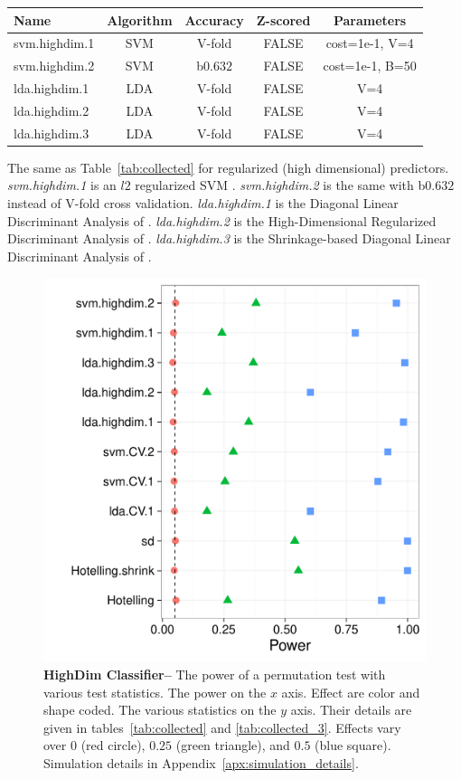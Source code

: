 \documentclass[12pt,a4paper]{article}
\theoremstyle{definition}
\begin{document}
\begin{tcolorbox}
\centering
\begin{tabular}{l|c|c|c|c}
Name & Algorithm & Accuracy & Z-scored & Parameters\\ 
\hline
\hline
svm.highdim.1 & SVM & V-fold & FALSE & cost=1e-1, V=4 \\ 
svm.highdim.2 & SVM & b$0.632$ & FALSE & cost=1e-1, B=50 \\ 
lda.highdim.1 & LDA & V-fold & FALSE & V=4 \\ 
lda.highdim.2 & LDA & V-fold & FALSE & V=4 \\ 
lda.highdim.3 & LDA & V-fold & FALSE & V=4 \\ 
\end{tabular} 
\captionsetup{type=table}
\caption{
The same as Table~\ref{tab:collected} for regularized (high dimensional) predictors. 
\emph{svm.highdim.1} is an $l2$ regularized SVM \cite{friedman_regularization_2010}. 
\emph{svm.highdim.2} is the same with b$0.632$ instead of V-fold cross validation. 
\emph{lda.highdim.1} is the Diagonal Linear Discriminant Analysis of \cite{dudoit_comparison_2002}.
\emph{lda.highdim.2} is the High-Dimensional Regularized Discriminant Analysis of \cite{ramey_high-dimensional_2016}.
\emph{lda.highdim.3} is the Shrinkage-based Diagonal Linear Discriminant Analysis of \cite{pang_shrinkage-based_2009}.
} 
\label{tab:collected_3}
\end{tcolorbox}


\begin{figure}[ht]
\centering
	  \includegraphics[width=0.7\linewidth]{"art/2016-08-13 22:55:43"}
	  \caption{
\textbf{HighDim Classifier--} 
		The power of a permutation test with various test statistics. 
		The power on the $x$ axis. 
		Effect are color and shape coded. 
		The various statistics on the $y$ axis. 
		Their details are given in tables~\ref{tab:collected} and \ref{tab:collected_3}. 
		Effects vary over $0$ (red circle), $0.25$ (green triangle), and $0.5$ (blue square). 
		Simulation details in Appendix~\ref{apx:simulation_details}.
} 
	\label{fig:highdim}
\end{figure}
\end{document}

